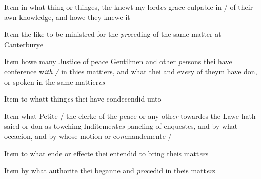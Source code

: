 \documentclass[12pt, a4paper]{book}
\begin{document}
            			
		\ifthenelse{\isodd{\thepage}}
		{\reversemarginpar}
		{\normalmarginpar}
		It\textit{e}m in what thing or thinges, the knewt my lord\textit{es} grace culpable in / of their awn knowledge, and howe they knewe it
            		

			 
	
		\ifthenelse{\isodd{\thepage}}
		{\reversemarginpar}
		{\normalmarginpar}
		It\textit{e}m the like to be ministred for the \textit{pro}ceding of the same matter at Canterburye 
            		
	
			
	
		\ifthenelse{\isodd{\thepage}}
		{\reversemarginpar}
		{\normalmarginpar}
		It\textit{e}m howe many Justice of peace Gentilmen and other \textit{per}sons thei have conference w\textit{ith /} in thies mattiers, and what thei and ev\textit{er}y of theym have don, or spoken in the same mattier\textit{es} 
            		
	
			
	
		\ifthenelse{\isodd{\thepage}}
		{\reversemarginpar}
		{\normalmarginpar}
		Item to whatt thing\textit{es} thei have condecendid unto 
            		
	
			
	
		\ifthenelse{\isodd{\thepage}}
		{\reversemarginpar}
		{\normalmarginpar}
		It\textit{e}m what Petite / the clerke of the peace or any oth\textit{er} towardes the Lawe hath saied or don as towching Inditeme\textit{n}t\textit{es} paneling of enquestes, and by what occacion, and by whose motion or co\textit{m}mandemente / 
            		
	
			
	
		\ifthenelse{\isodd{\thepage}}
		{\reversemarginpar}
		{\normalmarginpar}
		It\textit{e}m to what ende or effecte thei entendid to bring theis matt\textit{er}s 
            		
	
			
	
		\ifthenelse{\isodd{\thepage}}
		{\reversemarginpar}
		{\normalmarginpar}
		It\textit{e}m by what authorite thei beganne and \textit{pro}cedid in theis matt\textit{er}s 
            		
\end{document}
